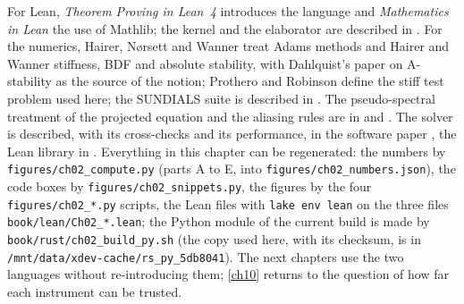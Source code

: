 For Lean, \emph{Theorem Proving in Lean~4} \cite{TPIL4} introduces the language and \emph{Mathematics in Lean} \cite{MIL} the use of Mathlib; the kernel and the elaborator are described in \cite{deMoura2021}. For the numerics, Hairer, N{\o}rsett and Wanner \cite{HairerNorsettWanner1993} treat Adams methods and
Hairer and Wanner \cite{HairerWanner1996} stiffness, BDF and absolute stability, with Dahlquist's paper on A-stability \cite{Dahlquist1963} as the source of the notion; Prothero and Robinson \cite{ProtheroRobinson1974} define the stiff test problem used here; the SUNDIALS suite is described in \cite{Hindmarsh2005}. The
pseudo-spectral treatment of the projected equation and the aliasing rules are in \cite{Blakie2008} and \cite{Orszag1971}. The solver is described, with its cross-checks and its performance, in the software paper \cite{Callens2026sw}, the Lean library in \cite{Callens2026lib}. Everything in this chapter can be regenerated: the numbers by
\texttt{figures/ch02\_compute.py} (parts A to E, into \texttt{figures/ch02\_numbers.json}), the code boxes by \texttt{figures/ch02\_snippets.py}, the figures by the four \texttt{figures/ch02\_*.py} scripts, the Lean files with
\texttt{lake env lean} on the three files \texttt{book/lean/Ch02\_*.lean}; the Python module of the current build is made by \texttt{book/rust/ch02\_build\_py.sh} (the copy used here, with its checksum, is in \texttt{/mnt/data/xdev-cache/rs\_py\_5db8041}). The next chapters use the two languages without
re-introducing them; \cref{ch10} returns to the question of how far each instrument can be trusted.

